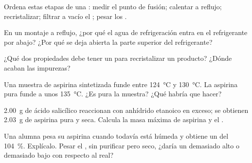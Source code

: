 \begin{exercise}[$\star$]\label{exo:g10:synthesis-yield:2}
Ordena estas etapas de una : medir el punto de fusión; calentar
a reflujo; recristalizar; filtrar a vacío el ; pesar los
.
\end{exercise}

\begin{exercise}[$\star$]\label{exo:g10:synthesis-yield:3}
En un montaje a reflujo, ¿por qué el agua de refrigeración entra en el
refrigerante por abajo? ¿Por qué se deja abierta la parte superior del
refrigerante?
\end{exercise}

\begin{exercise}[$\star$]\label{exo:g10:synthesis-yield:4}
¿Qué dos propiedades debe tener un  para recristalizar un
producto? ¿Dónde acaban las impurezas?
\end{exercise}

\begin{exercise}[$\star$]\label{exo:g10:synthesis-yield:5}
Una muestra de aspirina sintetizada funde entre \qty{124}{\celsius} y
\qty{130}{\celsius}. La aspirina pura funde a unos \qty{135}{\celsius}.
¿Es pura la muestra? ¿Qué habría que hacer?
\end{exercise}

\begin{exercise}[$\star\star$]\label{exo:g10:synthesis-yield:6}
\qty{2.00}{g} de ácido salicílico reaccionan con anhídrido etanoico en
exceso; se obtienen \qty{2.03}{g} de aspirina pura y seca. Calcula la
masa máxima de aspirina y el .
\end{exercise}

\begin{exercise}[$\star\star$]\label{exo:g10:synthesis-yield:7}
Una alumna pesa su aspirina cuando todavía está húmeda y obtiene un
 del \qty{104}{\percent}. Explícalo. Pesar el ,
sin purificar pero seco, ¿daría un  demasiado alto o
demasiado bajo con respecto al  real?
\end{exercise}

